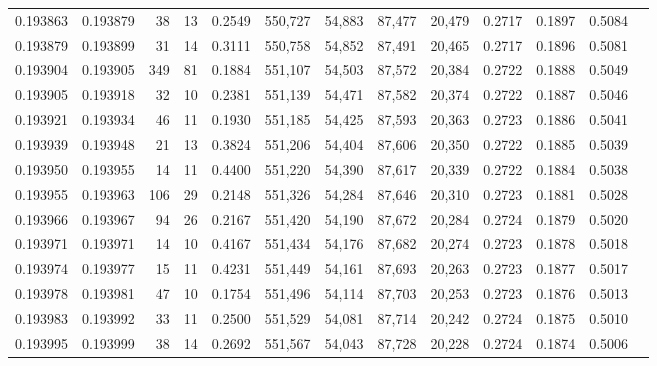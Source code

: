 \begin{tabular}{rrrrrrrrrrrrr}
0.193863 & 0.193879 &    38 &  13 &                                     0.2549 & 550,727 &  54,883 &  87,477 &  20,479 & 0.2717 & 0.1897 & 0.5084 \\
0.193879 & 0.193899 &    31 &  14 &                                     0.3111 & 550,758 &  54,852 &  87,491 &  20,465 & 0.2717 & 0.1896 & 0.5081 \\
0.193904 & 0.193905 &   349 &  81 &                                     0.1884 & 551,107 &  54,503 &  87,572 &  20,384 & 0.2722 & 0.1888 & 0.5049 \\
0.193905 & 0.193918 &    32 &  10 &                                     0.2381 & 551,139 &  54,471 &  87,582 &  20,374 & 0.2722 & 0.1887 & 0.5046 \\
0.193921 & 0.193934 &    46 &  11 &                                     0.1930 & 551,185 &  54,425 &  87,593 &  20,363 & 0.2723 & 0.1886 & 0.5041 \\
0.193939 & 0.193948 &    21 &  13 &                                     0.3824 & 551,206 &  54,404 &  87,606 &  20,350 & 0.2722 & 0.1885 & 0.5039 \\
0.193950 & 0.193955 &    14 &  11 &                                     0.4400 & 551,220 &  54,390 &  87,617 &  20,339 & 0.2722 & 0.1884 & 0.5038 \\
0.193955 & 0.193963 &   106 &  29 &                                     0.2148 & 551,326 &  54,284 &  87,646 &  20,310 & 0.2723 & 0.1881 & 0.5028 \\
0.193966 & 0.193967 &    94 &  26 &                                     0.2167 & 551,420 &  54,190 &  87,672 &  20,284 & 0.2724 & 0.1879 & 0.5020 \\
0.193971 & 0.193971 &    14 &  10 &                                     0.4167 & 551,434 &  54,176 &  87,682 &  20,274 & 0.2723 & 0.1878 & 0.5018 \\
0.193974 & 0.193977 &    15 &  11 &                                     0.4231 & 551,449 &  54,161 &  87,693 &  20,263 & 0.2723 & 0.1877 & 0.5017 \\
0.193978 & 0.193981 &    47 &  10 &                                     0.1754 & 551,496 &  54,114 &  87,703 &  20,253 & 0.2723 & 0.1876 & 0.5013 \\
0.193983 & 0.193992 &    33 &  11 &                                     0.2500 & 551,529 &  54,081 &  87,714 &  20,242 & 0.2724 & 0.1875 & 0.5010 \\
0.193995 & 0.193999 &    38 &  14 &                                     0.2692 & 551,567 &  54,043 &  87,728 &  20,228 & 0.2724 & 0.1874 & 0.5006 \\

\end{tabular}
